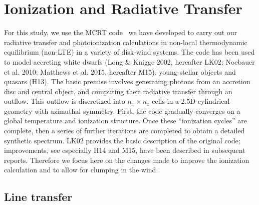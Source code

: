 \documentclass[useAMS,usenatbib]{mn2e_x}
\begin{document}

\section{Ionization and Radiative Transfer}

For this study, we use the MCRT code \py\ we have developed to carry out our 
radiative transfer and photoionization calculations in non-local thermodynamic 
equilibrium (non-LTE) in a variety of disk-wind systems. 
The code has been used to model accreting white dwarfs 
(Long \& Knigge 2002, hereafter LK02; Noebauer et al. 2010; 
Matthews et al. 2015, hereafter M15), young-stellar objects \citep{simmacro2005}
and quasars (H13).\nocite{noebauer, M15, LK02}  
The basic premise involves generating photons from an accretion disc
and central object, and computing their radiative transfer through an outflow.
This outflow is discretized into $n_x \times n_z$ cells in a 2.5D
cylindrical geometry with azimuthal symmetry.
First, the code gradually converges on a global temperature and ionization structure.
Once these ``ionization cycles'' are complete, then a series of further iterations
are completed to obtain a detailed synthetic spectrum.
LK02 provides the basic description of the original code; improvements, 
see especially H14 and M15, have been described in subsequent reports.  
Therefore we focus here on the changes made to improve the ionization calculation 
and to allow for clumping in the wind.


\subsection{Line transfer}
\end{document}
